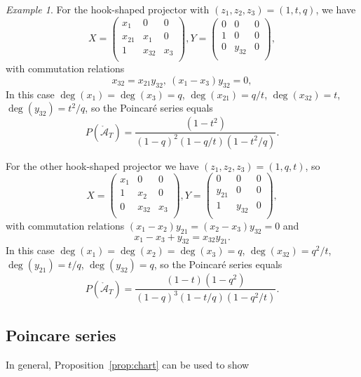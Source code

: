 \documentclass[12pt]{amsart}
\numberwithin{equation}{section}
\theoremstyle{definition}
\theoremstyle{remark}
\newtheorem{example}[theorem]{Example}
\newcommand{\CA}{\mathcal{A}}
\renewcommand{\1}{\mathbf{1}}
\newcommand{\oCA}{\mathring{\CA}}
\begin{document}
\begin{example}
For the hook-shaped projector with $(z_1,z_2,z_3)=(1,t,q)$, we have
$$
X=\left(\begin{matrix}
x_1 & 0 & 0\\
x_{21}   & x_1 & 0\\
1 & x_{32} & x_3\\
\end{matrix}\right),
Y=\left(\begin{matrix}
0 & 0 & 0\\
1 & 0 & 0\\
0 & y_{32} & 0\\
\end{matrix}\right),
$$
with commutation relations
$$
x_{32}=x_{21}y_{32},\ (x_1-x_3)y_{32}=0,
$$
In this case $\deg(x_1)=\deg(x_3)=q$, $\deg(x_{21})=q/t$, $\deg(x_{32})=t$, $\deg(y_{32})=t^2/q$, so the Poincar\'e series equals 
$$
P(\oCA_T)=\frac{(1-t^2)}{(1-q)^2(1-q/t)(1-t^2/q)}.
$$

For the other hook-shaped projector we have $(z_1,z_2,z_3)=(1,q,t)$, so
$$
X=\left(\begin{matrix}
x_1 & 0 & 0\\
1   & x_2 & 0\\
0 & x_{32} & x_3\\
\end{matrix}\right),
Y=\left(\begin{matrix}
0 & 0 & 0\\
y_{21} & 0 & 0\\
1 & y_{32} & 0\\
\end{matrix}\right),
$$
with commutation relations $(x_1-x_2)y_{21}=(x_2-x_3)y_{32}=0$ and 
$$
x_1-x_3+y_{32}=x_{32}y_{21}.
$$
In this case $\deg(x_1)=\deg(x_2)=\deg(x_3)=q$, $\deg(x_{32})=q^2/t$, $\deg(y_{21})=t/q$, $\deg(y_{32})=q$, so the Poincar\'e series equals 
$$
P(\oCA_T)=\frac{(1-t)(1-q^2)}{(1-q)^3(1-t/q)(1-q^2/t)}.
$$
\end{example}

\subsection{Poincare series}

In general,  Proposition~\ref{prop:chart} can be used to show
\end{document}
